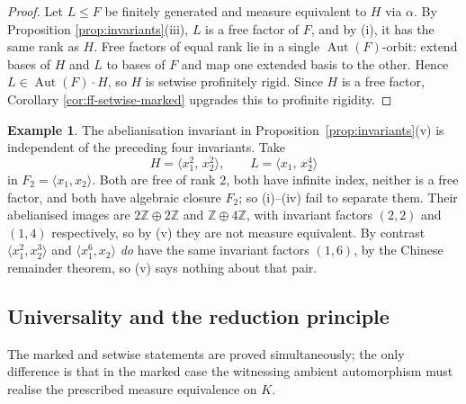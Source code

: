 \documentclass[11pt]{amsart}
\theoremstyle{plain}
\theoremstyle{definition}
\newtheorem{example}[theorem]{Example}
\begin{document}
\begin{proof}
Let $L\le F$ be finitely generated and measure equivalent to $H$
via $\alpha$. By Proposition \ref{prop:invariants}(iii), $L$ is a free factor of $F$,
and by (i), it has the same rank as $H$.
Free factors of equal rank lie in a single $\operatorname{Aut}(F)$-orbit:
extend bases of $H$ and $L$ to bases of $F$ and map one extended
basis to the other. Hence $L\in\operatorname{Aut}(F)\cdot H$, so $H$
is setwise profinitely rigid. Since $H$ is a free factor,
Corollary \ref{cor:ff-setwise-marked} upgrades this to profinite rigidity.
\end{proof}
\begin{example}\label{ex:invariants}
The abelianisation invariant in Proposition~\ref{prop:invariants}(v) is
independent of the preceding four invariants.  Take
\[
  H=\langle x_1^{2},\,x_2^{2}\rangle,\qquad L=\langle x_1,\,x_2^{4}\rangle
\]
in $F_2=\langle x_1,x_2\rangle$.  Both are free of rank $2$, both have infinite
index, neither is a free factor, and both have algebraic closure $F_2$; so
(i)--(iv) fail to separate them.  Their abelianised images are
$2\mathbb Z\oplus2\mathbb Z$ and $\mathbb Z\oplus4\mathbb Z$, with invariant
factors $(2,2)$ and $(1,4)$ respectively, so by (v) they are not measure
equivalent.  By contrast $\langle x_1^{2},x_2^{3}\rangle$ and
$\langle x_1^{6},x_2\rangle$ \emph{do} have the same invariant factors $(1,6)$,
by the Chinese remainder theorem, so (v) says nothing about that pair.
\end{example}


\subsection{Universality and the reduction principle}\label{sec:universal}


The marked and setwise statements are proved simultaneously; the only difference is
that in the marked case the witnessing ambient automorphism must realise the prescribed
measure equivalence on $K$.
\end{document}
